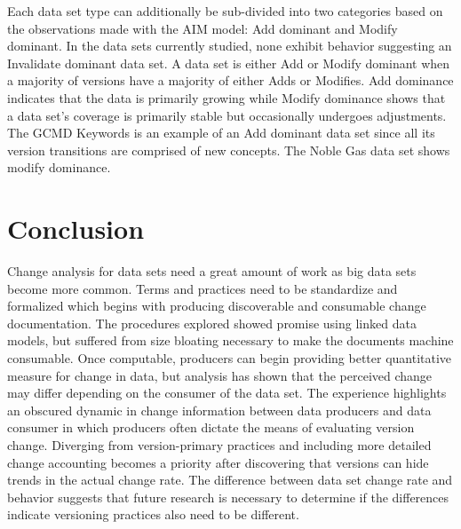 Each data set type can additionally be sub-divided into two categories based on the observations made with the AIM model: Add dominant and Modify dominant.  In the data sets currently studied, none exhibit behavior suggesting an Invalidate dominant data set.  A data set is either Add or Modify dominant when a majority of versions have a majority of either Adds or Modifies.  Add dominance indicates that the data is primarily growing while Modify dominance shows that a data set’s coverage is primarily stable but occasionally undergoes adjustments.  The GCMD Keywords is an example of an Add dominant data set since all its version transitions are comprised of new concepts.  The Noble Gas data set shows modify dominance.

\section{Conclusion}

Change analysis for data sets need a great amount of work as big data sets become more common.
Terms and practices need to be standardize and formalized which begins with producing discoverable and consumable change documentation.
The procedures explored showed promise using linked data models, but suffered from size bloating necessary to make the documents machine consumable.
Once computable, producers can begin providing better quantitative measure for change in data, but analysis has shown that the perceived change may differ depending on the consumer of the data set.
The experience highlights an obscured dynamic in change information between data producers and data consumer in which producers often dictate the means of evaluating version change.
Diverging from version-primary practices and including more detailed change accounting becomes a priority after discovering that versions can hide trends in the actual change rate.
The difference between data set change rate and behavior suggests that future research is necessary to determine if the differences indicate versioning practices also need to be different.
